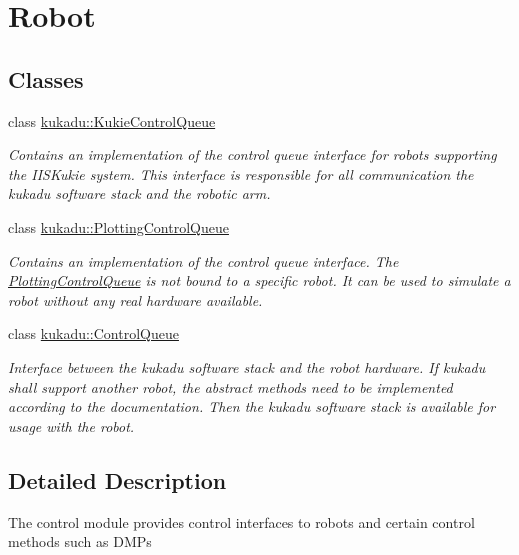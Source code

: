 \hypertarget{group__Robot}{\section{Robot}
\label{group__Robot}
}
\subsection*{Classes}
\begin{DoxyCompactItemize}
\item 
class \hyperlink{classkukadu_1_1KukieControlQueue}{kukadu\-::\-Kukie\-Control\-Queue}
\begin{DoxyCompactList}\small\item\em Contains an implementation of the control queue interface for robots supporting the I\-I\-S\-Kukie system. This interface is responsible for all communication the kukadu software stack and the robotic arm. \end{DoxyCompactList}\item 
class \hyperlink{classkukadu_1_1PlottingControlQueue}{kukadu\-::\-Plotting\-Control\-Queue}
\begin{DoxyCompactList}\small\item\em Contains an implementation of the control queue interface. The \hyperlink{classkukadu_1_1PlottingControlQueue}{Plotting\-Control\-Queue} is not bound to a specific robot. It can be used to simulate a robot without any real hardware available. \end{DoxyCompactList}\item 
class \hyperlink{classkukadu_1_1ControlQueue}{kukadu\-::\-Control\-Queue}
\begin{DoxyCompactList}\small\item\em Interface between the kukadu software stack and the robot hardware. If kukadu shall support another robot, the abstract methods need to be implemented according to the documentation. Then the kukadu software stack is available for usage with the robot. \end{DoxyCompactList}\end{DoxyCompactItemize}


\subsection{Detailed Description}
The control module provides control interfaces to robots and certain control methods such as D\-M\-Ps 